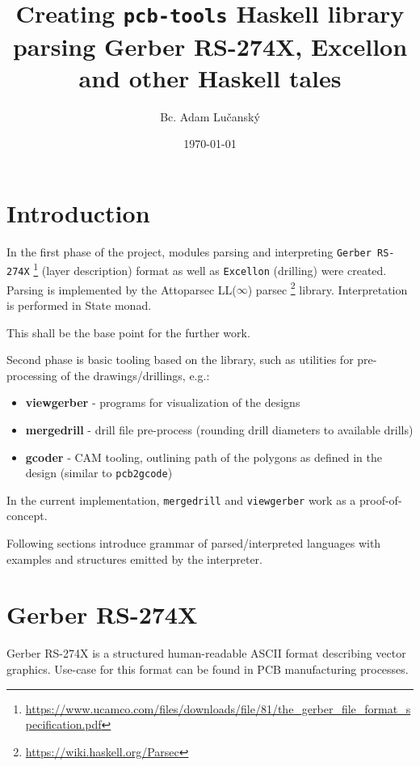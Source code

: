 \documentclass[12pt,a4paper]{article}
\begin{document}
\title{\vspace{-2.0cm} Creating \texttt{pcb-tools} Haskell library 
				\\ \small{parsing Gerber RS-274X, Excellon and other Haskell tales}}
\author{Bc. Adam Lučanský}
\date{\today}
\maketitle
{}

\section{Introduction}
In the first phase of the project, modules parsing and interpreting \texttt{Gerber RS-274X} \footnote{\url{https://www.ucamco.com/files/downloads/file/81/the_gerber_file_format_specification.pdf}} (layer description) format as well as \texttt{Excellon} (drilling) were created.
Parsing is implemented by the Attoparsec LL($\infty$) parsec \footnote{\url{https://wiki.haskell.org/Parsec}} library. Interpretation is performed in State monad.

This shall be the base point for the further work.

Second phase is basic tooling based on the library, such as utilities for pre-processing of the drawings/drillings, e.g.:
\begin{itemize}
	\item \textbf{viewgerber} - programs for visualization of the designs
	\item \textbf{mergedrill} - drill file pre-process (rounding drill diameters to available drills)
	\item \textbf{gcoder} - CAM tooling, outlining path of the polygons as defined in the design (similar to \texttt{pcb2gcode})
\end{itemize}
In the current implementation, \texttt{mergedrill} and \texttt{viewgerber} work as a proof-of-concept.

Following sections introduce grammar of parsed/interpreted languages with examples and structures emitted by the interpreter.

\newpage %
\section{Gerber RS-274X}
Gerber RS-274X is a structured human-readable ASCII format describing vector graphics. Use-case for this format can be found in PCB manufacturing processes.
\end{document}
